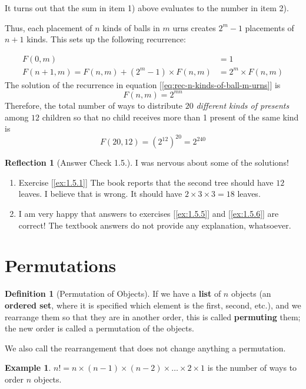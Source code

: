 \documentclass[11pt]{book}
\theoremstyle{definition}
\newtheorem{definition}{Definition}
\theoremstyle{plain}
\theoremstyle{definition}
\newtheorem{example}{Example}
\theoremstyle{problemstyle}
\theoremstyle{remark}
\theoremstyle{definition}
\newtheorem{reflection}{Reflection}
\begin{document}
It turns out that the sum in item 1) above evaluates to the number in item 2). 

Thus, each placement of $n$ kinds of balls in $m$ urns creates $2^m-1$ placements of $n+1$ kinds. This sets up the following recurrence:

    \begin{align}
        F(0,m)&=1\nonumber\\
        F(n+1,m)=F(n,m)+(2^m-1)\times F(n,m)&=2^m\times F(n,m)
        \label{eq:rec-n-kinds-of-ball-m-urns}
    \end{align}
The solution of the recurrence in equation [\ref{eq:rec-n-kinds-of-ball-m-urns}] is
\[
    F(n,m)=2^{mn}
\]
    Therefore, the total number of ways to distribute $20$ \emph{different kinds of presents} among $12$ children so that no child receives more than 1 present of the same kind is 
    \[
        F(20,12)=(2^{12})^{20}=2^{240}
    \]

\begin{reflection}[Answer Check 1.5.\textasteriskcentered]

    I was nervous about some of the solutions!
    \begin{enumerate}
        \item Exercise [\ref{ex:1.5.1}] The book reports that the second tree should have $12$ leaves. I believe that is wrong. It should have $2\times3\times3=18$ leaves. 
        \item I am very happy that answers to exercises [\ref{ex:1.5.5}] and [\ref{ex:1.5.6}] are correct! The textbook answers do not provide any explanation, whatsoever.
    \end{enumerate}
\end{reflection}

\section{Permutations}
\begin{definition}[Permutation of Objects]
    If we have a \textbf{list} of $n$ objects (an \textbf{ordered set}, where it is specified which element is the first, second, etc.), and we rearrange them so that they are in another order, this is called \textbf{permuting} them; the new order is called a permutation of the objects. 

    We also call the rearrangement that does not change anything a permutation.
\end{definition}
\begin{example}
    $n!=n\times(n-1)\times(n-2)\times\dots\times2\times1$ is the number of ways to order $n$ objects.
\end{example}
\end{document}
